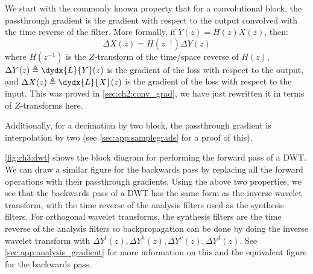 We start with the commonly known property that for a convolutional block, the
passthrough gradient is the gradient with respect to the output
convolved with the time reverse of the filter. More formally, if
$Y(z) = H(z) X(z)$, then:
%
\begin{equation}\label{eq:ch3:backprop}
  \Delta X(z) = H(z^{-1}) \Delta Y(z)
\end{equation}
%
where $H(z^{-1})$ is the $Z$-transform of the time/space reverse of $H(z)$,
$\Delta Y(z) \triangleq \dydx{L}{Y}(z)$ is the gradient of the loss with respect
to the output, and $\Delta X(z) \triangleq \dydx{L}{X}(z)$ is the gradient of
the loss with respect to the input. This was proved in \autoref{sec:ch2:conv_grad}, we
have just rewritten it in terms of $Z$-transforms here.

Additionally, for a decimation by two block, the passthrough gradient is
interpolation by two (see \autoref{sec:app:samplegrads}
for a proof of this).

\autoref{fig:ch3:dwt} shows the block diagram for performing the forward pass of
a DWT. We can draw a similar figure for the backwards pass by replacing all the
forward operations with their passthrough gradients. Using the above two
properties, we see that the backwards pass of a DWT has the same form as
the inverse wavelet transform, with the time reverse of the analysis filters
used as the synthesis filters. For orthogonal wavelet transforms, the synthesis
filters are the time reverse of the analysis filters so backpropagation can be
done by doing the inverse wavelet transform with $\Delta Y^l(z), \Delta Y^h(z),
\Delta Y^v(z), \Delta Y^d(z)$. 
See \autoref{sec:app:analysis_gradient} for more information on this
and the equivalent figure for the backwards pass.

